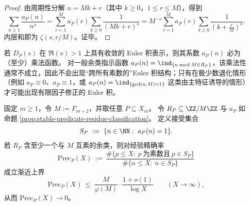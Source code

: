 \begin{proof}
由周期性分解 \(n=Mk+r\)（其中 \(k\ge 0\)，\(1\le r\le M\)），得到
\[
\sum_{n\ge 1}\frac{a_P(n)}{n^s}
=\sum_{r=1}^{M}a_P(r)\sum_{k\ge 0}\frac{1}{(Mk+r)^s}
=M^{-s}\sum_{r=1}^{M}a_P(r)\sum_{k\ge 0}\frac{1}{\left(k+\frac{r}{M}\right)^s}.
\]
内层和即为 \(\zeta(s,r/M)\)。证毕。
\end{proof}

\begin{remark}\label{rem:euler-product-obstruction-periodic-indicator}
若 \(D_P(s)\) 在 \(\Re(s)>1\) 上具有收敛的 Euler 积表示，则其系数 \(a_P(n)\) 必为（至少）乘法函数。
对一般余类指示函数 \(a_P(n)=\ind_{\{n\bmod M\in R_P\}}\)，该乘法性通常不成立，因此不会出现“跨所有素数的”Euler 积结构；只有在极少数退化情形（例如 \(a_P\equiv 0\)、\(a_P\equiv 1\)，或 \(a_P(n)=\ind_{\{\gcd(n,M)=1\}}\) 这类由主特征诱导的情形）才可能出现有限因子修正的 Euler 积。
\end{remark}

\begin{theorem}[固定分辨率余类筛的素数精确率退化]\label{thm:fixed-resolution-prime-sieve-precision-to-zero}
固定 \(m\ge 1\)，令 \(M:=F_{m+2}\)，并取任意 \(P\subseteq X_m\)。
令 \(R_P\subseteq\ZZ/M\ZZ\) 与 \(a_P\) 如命题 \ref{prop:stable-predicate-residue-classification}。
定义接受集合
\[
S_P\ :=\ \{n\in\NN:\ a_P(n)=1\}.
\]
若 \(R_P\) 含至少一个与 \(M\) 互素的余类，则对经验精确率
\[
\mathrm{Prec}_P(X)\ :=\ \frac{\#\{p\le X:\ p\ \text{为素数且}\ p\in S_P\}}{\#\{n\le X:\ n\in S_P\}}
\]
成立渐近上界
\[
\mathrm{Prec}_P(X)\ \le\ \frac{M}{\varphi(M)}\cdot \frac{1+o(1)}{\log X}\qquad(X\to\infty),
\]
从而 \(\mathrm{Prec}_P(X)\to 0\)。
\end{theorem}

